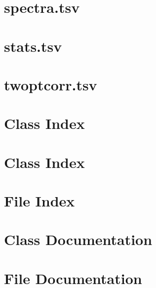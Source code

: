 \documentclass[letterpaper]{book}
\begin{document}
\chapter{spectra.tsv}
\label{spectra_tsv}
\hypertarget{spectra_tsv}{}

\chapter{stats.tsv}
\label{stats_tsv}
\hypertarget{stats_tsv}{}

\chapter{twoptcorr.tsv}
\label{twoptcorr_tsv}
\hypertarget{twoptcorr_tsv}{}

\chapter{Class Index}

\chapter{Class Index}

\chapter{File Index}

\chapter{Class Documentation}





























\chapter{File Documentation}
























\printindex
\end{document}
